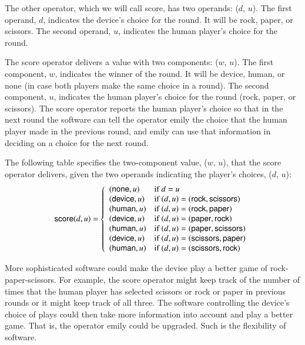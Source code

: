 The other operator, which we will call \textsf{score},
has two operands: ($d$, $u$).
The first operand, $d$,
indicates the  device's choice for the round.
It will be \textsf{rock}, \textsf{paper}, or \textsf{scissors}.
The second operand, $u$, indicates the human player's choice for the round.

The \textsf{score} operator delivers a value with two components: ($w$, $u$).
The first component, $w$, indicates the winner of the round.
It will be \textsf{device}, \textsf{human}, or \textsf{none}
(in case both players make the same choice in a round).
The second component, $u$, indicates the human player's choice for the round
(\textsf{rock}, \textsf{paper}, or \textsf{scissors}).
The \textsf{score} operator reports the human player's choice so that
in the next round the software
can tell the operator \textsf{emily}
the choice that the human player made in the previous round,
and \textsf{emily} can use that information in deciding on a choice
for the next round.

The following table specifies
the two-component value, ($w$, $u$), that the \textsf{score} operator
delivers, given the two operands indicating the player's choices, ($d$, $u$):
\begin{displaymath}
\textsf{score}(d,u) =
   \left\{
        \begin{array}{ll}
        (\mbox{\textsf{none}}, u)   & \mbox{if } d = u \\
        (\mbox{\textsf{device}}, u) & \mbox{if } (d,u) = (\mbox{\textsf{rock}}, \mbox{\textsf{scissors}}) \\
        (\mbox{\textsf{human}}, u)  & \mbox{if } (d,u) = (\mbox{\textsf{rock}}, \mbox{\textsf{paper}}) \\
        (\mbox{\textsf{device}}, u) & \mbox{if } (d,u) = (\mbox{\textsf{paper}}, \mbox{\textsf{rock}}) \\
        (\mbox{\textsf{human}}, u)  & \mbox{if } (d,u) = (\mbox{\textsf{paper}}, \mbox{\textsf{scissors}}) \\
        (\mbox{\textsf{device}}, u) & \mbox{if } (d,u) = (\mbox{\textsf{scissors}}, \mbox{\textsf{paper}}) \\
        (\mbox{\textsf{human}}, u)  & \mbox{if } (d,u) = (\mbox{\textsf{scissors}}, \mbox{\textsf{rock}}) \\
        \end{array}
   \right.
\end{displaymath}

More sophisticated software could make the device play a better game of
rock-paper-scissors.
For example, the \textsf{score} operator might
keep track of the number of times that the human player
has selected scissors or rock or paper
in previous rounds or it might keep track of all three.
The software controlling the device's choice of plays could
then take more information into account and play a better game.
That is, the operator \textsf{emily} could be upgraded.
Such is the flexibility of software.

